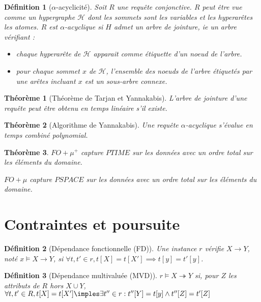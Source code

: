 \documentclass[landscape]{article}
\newcommand{\H}{\mathscr{H}}
\newcommand{\1}{\mathbbm{1}}
\newtheorem{theo}{Théorème}
\newtheorem{defi}{Définition}
\begin{document}
\begin{multicols}{2}
    \begin{defi}[$\alpha$-acyclicité]
        Soit $R$ une requête conjonctive. $R$ peut être vue comme un hypergraphe $\H$
        dont les sommets sont les variables et les hyperarêtes les atomes. $R$ est
        $\alpha$-acyclique si $H$ admet un arbre de jointure, ie un arbre vérifiant :
        \begin{itemize}
            \item chaque hyperarête de $\H$ apparait comme étiquette d'un noeud de l'arbre.
            \item pour chaque sommet $x$ de $\H$, l'ensemble des noeuds de l'arbre étiquetés
                par une arêtes incluant $x$ est un sous-arbre connexe.
        \end{itemize}
    \end{defi}

    \begin{theo}[Théorème de Tarjan et Yannakabis]
        L'arbre de jointure d'une requête peut être obtenu en temps linéaire
        s'il existe.
    \end{theo}

    \begin{theo}[Algorithme de Yannakabis]
        Une requête $\alpha$-acyclique s'évalue en temps combiné polynomial.
    \end{theo}

    \begin{theo} $FO+\mu^+$ capture $PTIME$ sur les données avec un ordre total sur
        les éléments du domaine.
        
        $FO+\mu$ capture $PSPACE$ sur les données avec un ordre total sur les éléments
        du domaine.
    \end{theo}

    \section{Contraintes et poursuite}

    \begin{defi}[Dépendance fonctionnelle (FD)]
        Une instance $r$ vérifie $X\rightarrow Y$, noté $x\models X\rightarrow Y$,
        si $\forall t, t'\in r, t[X] = t[X']\implies t[y] = t'[y]$.
    \end{defi}

    \begin{defi}[Dépendance multivaluée (MVD)]
        $r\models X\twoheadrightarrow Y$ si, pour $Z$ les attributs de $R$ hors
        $X\cup Y$, $\forall t, t'\in R, t[X] = t[X'] \imples \exists t''\in r:
        t''[Y] = t[y] \wedge t''[Z] = t'[Z]$
    \end{defi}


\end{multicols}
\end{document}
